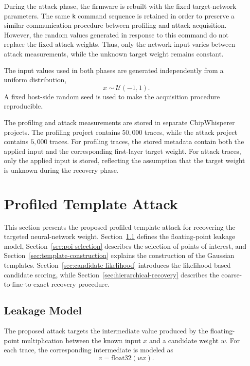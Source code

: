 \documentclass[conference]{IEEEtran}
\begin{document}
During the attack phase, the firmware is rebuilt with the fixed target-network parameters.
The same \texttt{k} command sequence is retained in order to preserve a similar communication procedure between profiling and attack acquisition.
However, the random values generated in response to this command do not replace the fixed attack weights.
Thus, only the network input varies between attack measurements, while the unknown target weight remains constant.

The input values used in both phases are generated independently from a uniform distribution,
\begin{equation*}
	x \sim \mathcal{U}(-1,1).
\end{equation*}
A fixed host-side random seed is used to make the acquisition procedure reproducible.

The profiling and attack measurements are stored in separate ChipWhisperer projects.
The profiling project contains $50{,}000$ traces, while the attack project contains $5{,}000$ traces.
For profiling traces, the stored metadata contain both the applied input and the corresponding first-layer target weight.
For attack traces, only the applied input is stored, reflecting the assumption that the target weight is unknown during the recovery phase.

\section{Profiled Template Attack}
\label{sec:template-attack}
This section presents the proposed profiled template attack for recovering the targeted neural-network weight.
Section~\ref{sec:leakage-model} defines the floating-point leakage model, Section~\ref{sec:poi-selection} describes the selection of points of interest, and Section~\ref{sec:template-construction} explains the construction of the Gaussian templates.
Section~\ref{sec:candidate-likelihood} introduces the likelihood-based candidate scoring, while Section~\ref{sec:hierarchical-recovery} describes the coarse-to-fine-to-exact recovery procedure.

\subsection{Leakage Model}
\label{sec:leakage-model}

The proposed attack targets the intermediate value produced by the floating-point multiplication between the known input $x$ and a candidate weight $w$.
For each trace, the corresponding intermediate is modeled as
\begin{equation*}
	v = \mathrm{float32}(wx).
\end{equation*}
\end{document}
